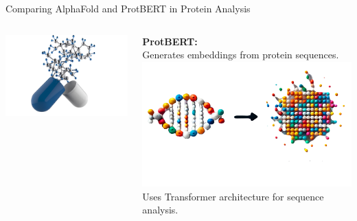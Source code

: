 \begin{frame}{Comparing AlphaFold and ProtBERT in Protein Analysis}
\begin{columns}
\begin{column}{0.5\textwidth}
{                    \vskip 1cm
                    \includegraphics[width = \textwidth]{images/drugdesign.png}
                    }
            \vspace{1em}
        \end{column}
        \begin{column}{0.5\textwidth}
            \textbf<1->{ProtBERT:}\\
                 {
                    Generates embeddings from protein sequences.
                    \vskip 1cm
                    \includegraphics[width = \textwidth]{images/embeddings.png}
                }
                 {
                    Uses Transformer architecture for sequence analysis.
                    \vskip 1cm
                    \centering
}
\end{column}
\end{columns}
\end{frame}
